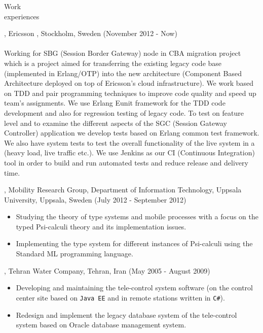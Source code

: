 \documentclass{resume}
\begin{document}

\begin{category}{Work \\experiences}

, Ericsson , Stockholm, Sweden (November 2012 - Now)\\ \\
Working for SBG (Session Border Gateway) node in CBA migration project which is a project 
aimed for transferring the existing legacy code base (implemented in Erlang/OTP) into the 
new architecture (Component Based Architecture deployed on top of Ericsson's cloud infrastructure). 
We work based on TDD and pair programming techniques to improve code quality and
speed up team's assignments. We use Erlang Eunit framework for the TDD code development and also
for regression testing of legacy code.
To test on feature level and to examine the different aspects of the SGC (Session Gateway Controller) 
application we develop tests based on Erlang common test framework. We 
also have system tests to test the overall functionality of the live system in a (heavy load, live traffic etc.). 
We use Jenkins as our CI (Continuous Integration) tool in order to build and run automated tests and  
reduce release and delivery time. 

, Mobility Research Group, Department of Information Technology, 
Uppsala University, Uppsala, Sweden (July 2012 - September 2012)\\ 
\begin{itemize}
 \item Studying the theory of type systems and mobile processes with a 
  focus on the typed Psi-calculi theory and its implementation issues.
 \item Implementing the type system for different instances of Psi-calculi 
  using the Standard ML programming language.
\end{itemize}

, Tehran Water Company, Tehran, Iran (May 2005 - August 2009)\\ 
\begin{itemize}
 \item Developing and maintaining the tele-control system software (on the control center site based 
  on \texttt{Java EE} and in remote stations written in \texttt{C\#}).
 \item Redesign and implement the legacy database system of the tele-control system 
  based on Oracle database management system.
\end{itemize}


\end{category}
\end{document}
